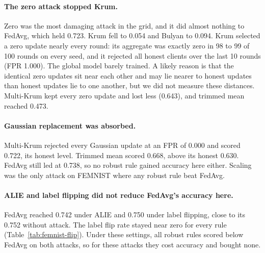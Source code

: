 \paragraph{The zero attack stopped Krum.}
Zero was the most damaging attack in the grid, and it did almost nothing to FedAvg, which held 0.723. Krum fell to 0.054 and Bulyan to 0.094. Krum selected a zero update nearly every round: its aggregate was exactly zero in 98 to 99 of 100 rounds on every seed, and it rejected all honest clients over the last 10 rounds (FPR 1.000). The global model barely trained. A likely reason is that the identical zero updates sit near each other and may lie nearer to honest updates than honest updates lie to one another, but we did not measure these distances. Multi-Krum kept every zero update and lost less (0.643), and trimmed mean reached 0.473.

\paragraph{Gaussian replacement was absorbed.}
Multi-Krum rejected every Gaussian update at an FPR of 0.000 and scored 0.722, its honest level. Trimmed mean scored 0.668, above its honest 0.630. FedAvg still led at 0.738, so no robust rule gained accuracy here either. Scaling was the only attack on FEMNIST where any robust rule beat FedAvg.

\paragraph{ALIE and label flipping did not reduce FedAvg's accuracy here.}
FedAvg reached 0.742 under ALIE and 0.750 under label flipping, close to its 0.752 without attack. The label flip rate stayed near zero for every rule (Table~\ref{tab:femnist-flip}). Under these settings, all robust rules scored below FedAvg on both attacks, so for these attacks they cost accuracy and bought none.

\begin{table}[H]
\centering
\caption{Paired difference from FedAvg under the same attack, with a two-sided 95\% $t$ interval on 2 degrees of freedom.}
\label{tab:femnist-paired}

\end{table}

\begin{table}[H]
\centering
\caption{FEMNIST filtering: fraction of malicious participants rejected (TPR).}
\label{tab:femnist-tpr}
\resizebox{\linewidth}{!}{}
\end{table}

